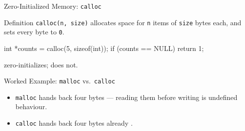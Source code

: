 \documentclass[aspectratio=169]{beamer}
\begin{document}
\begin{frame}[fragile]{Zero-Initialized Memory: \texttt{calloc}}
  \begin{block}{Definition}
    \texttt{calloc(n, size)} allocates space for \texttt{n} items of
    \texttt{size} bytes each, and sets every byte to \texttt{0}.
  \end{block}
\begin{semiverbatim}
int *counts = calloc(5, sizeof(int));
if (counts == NULL) return 1;
\end{semiverbatim}
   zero-initializes;  does not.
\end{frame}

\begin{frame}{Worked Example: \texttt{malloc} vs.\ \texttt{calloc}}
  \begin{center}
  \end{center}
  \begin{itemize}
    \item \texttt{malloc} hands back four  bytes --- reading
      them before writing is undefined behaviour.
    \item \texttt{calloc} hands back four bytes already .
  \end{itemize}
\end{frame}
\end{document}
